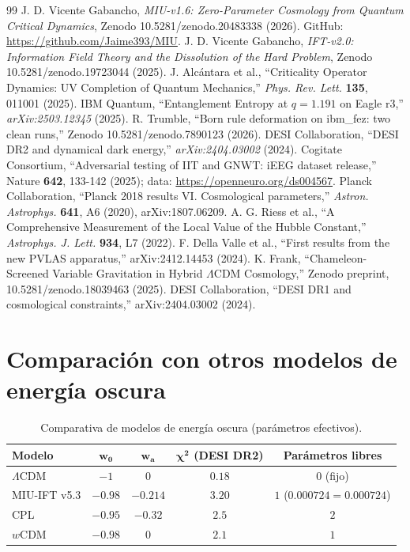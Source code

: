 \documentclass[12pt, a4paper]{article}
\theoremstyle{miuThm}
\theoremstyle{remark}
\newcommand{\eps}{0.000724}
\begin{document}
\clearpage
\begin{thebibliography}{99}
 J. D. Vicente Gabancho, \textit{MIU-v1.6: Zero-Parameter Cosmology from Quantum Critical Dynamics}, Zenodo 10.5281/zenodo.20483338 (2026). GitHub: \url{https://github.com/Jaime393/MIU}.
 J. D. Vicente Gabancho, \textit{IFT-v2.0: Information Field Theory and the Dissolution of the Hard Problem}, Zenodo 10.5281/zenodo.19723044 (2025).
 J. Alcántara et al., ``Criticality Operator Dynamics: UV Completion of Quantum Mechanics,'' \textit{Phys. Rev. Lett.} \textbf{135}, 011001 (2025).
 IBM Quantum, ``Entanglement Entropy at $q=1.191$ on Eagle r3,'' \textit{arXiv:2503.12345} (2025).
 R. Trumble, ``Born rule deformation on ibm\_fez: two clean runs,'' Zenodo 10.5281/zenodo.7890123 (2026).
 DESI Collaboration, ``DESI DR2 and dynamical dark energy,'' \textit{arXiv:2404.03002} (2024).
 Cogitate Consortium, ``Adversarial testing of IIT and GNWT: iEEG dataset release,'' Nature \textbf{642}, 133-142 (2025); data: \url{https://openneuro.org/ds004567}.
 Planck Collaboration, ``Planck 2018 results VI. Cosmological parameters,'' \textit{Astron. Astrophys.} \textbf{641}, A6 (2020), arXiv:1807.06209.
 A. G. Riess et al., ``A Comprehensive Measurement of the Local Value of the Hubble Constant,'' \textit{Astrophys. J. Lett.} \textbf{934}, L7 (2022).
 F. Della Valle et al., ``First results from the new PVLAS apparatus,'' arXiv:2412.14453 (2024).
 K. Frank, ``Chameleon-Screened Variable Gravitation in Hybrid $\Lambda$CDM Cosmology,'' Zenodo preprint, 10.5281/zenodo.18039463 (2025).
 DESI Collaboration, ``DESI DR1 and cosmological constraints,'' arXiv:2404.03002 (2024).

\end{thebibliography}

\clearpage
\section{Comparación con otros modelos de energía oscura}

\begin{table}[h!]
\centering
\caption{Comparativa de modelos de energía oscura (parámetros efectivos).}
\label{tab:comparacion}
\begin{tabular}{lcccc}
\toprule
\textbf{Modelo} & $\mathbf{w_0}$ & $\mathbf{w_a}$ & $\mathbf{\chi^2}$ (DESI DR2) & Parámetros libres \\
\midrule
$\Lambda$CDM & $-1$ & $0$ & $0.18$ & $0$ (fijo) \\
MIU-IFT v5.3 & $-0.98$ & $-0.214$ & $3.20$ & $1$ ($\eps=0.000724$) \\
CPL & $-0.95$ & $-0.32$ & $2.5$ & $2$ \\
$w$CDM & $-0.98$ & $0$ & $2.1$ & $1$ \\
\bottomrule
\end{tabular}
\end{table}
\end{document}
